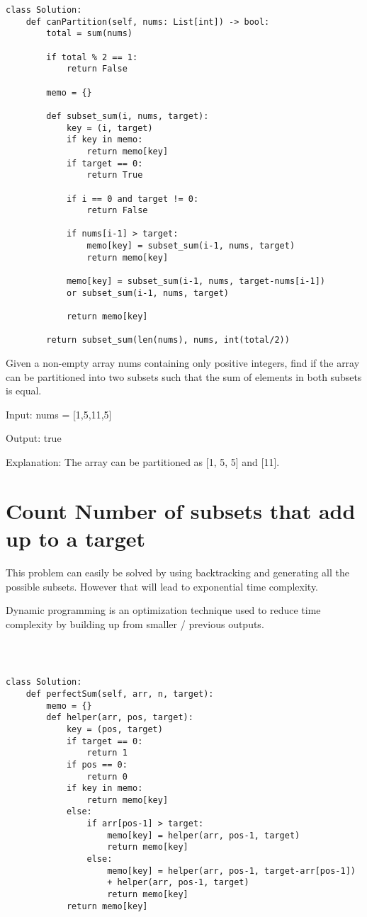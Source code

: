 \documentclass[24pt, a4]{article}
\begin{document}
\begin{lstlisting}
class Solution:
    def canPartition(self, nums: List[int]) -> bool:
        total = sum(nums)
        
        if total % 2 == 1:
            return False
        
        memo = {}
        
        def subset_sum(i, nums, target):
            key = (i, target)
            if key in memo:
                return memo[key]
            if target == 0:
                return True
            
            if i == 0 and target != 0:
                return False
            
            if nums[i-1] > target:
                memo[key] = subset_sum(i-1, nums, target)
                return memo[key]
            
            memo[key] = subset_sum(i-1, nums, target-nums[i-1]) 
            or subset_sum(i-1, nums, target)
            
            return memo[key]
        
        return subset_sum(len(nums), nums, int(total/2))
\end{lstlisting}

Given a non-empty array nums containing only positive integers, find if the array can be partitioned into two subsets such that the sum of elements in both subsets is equal.

Input: nums = [1,5,11,5]

Output: true

Explanation: The array can be partitioned as [1, 5, 5] and [11].

\newpage
\section{Count Number of subsets that add up to a target}

This problem can easily be solved by using backtracking and generating all the possible subsets. However that will lead to exponential time complexity.

Dynamic programming is an optimization technique used to reduce time complexity by building up from smaller / previous outputs.

\begin{lstlisting}



class Solution:
    def perfectSum(self, arr, n, target):
        memo = {}
        def helper(arr, pos, target):
            key = (pos, target)
            if target == 0:
                return 1
            if pos == 0:
                return 0
            if key in memo:
                return memo[key]
            else:
                if arr[pos-1] > target:
                    memo[key] = helper(arr, pos-1, target)
                    return memo[key]
                else:
                    memo[key] = helper(arr, pos-1, target-arr[pos-1])
                    + helper(arr, pos-1, target)
                    return memo[key]
            return memo[key]
\end{lstlisting}
\end{document}
